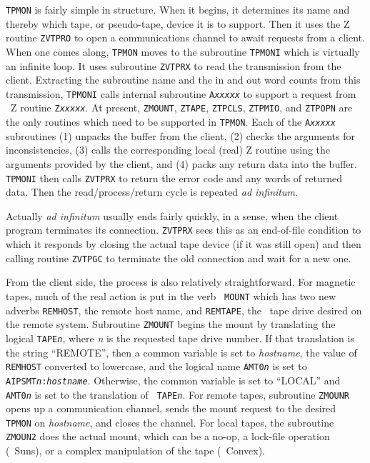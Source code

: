 {\tt TPMON} is fairly simple in structure.  When it begins, it
determines its name and thereby which tape, or pseudo-tape, device it
is to support.  Then it uses the Z routine {\tt ZVTPRO} to open a
communications channel to await requests from a client.  When one
comes along, {\tt TPMON} moves to the subroutine {\tt TPMONI} which is
virtually an infinite loop.  It uses subroutine {\tt ZVTPRX} to read
the transmission from the client.  Extracting the subroutine name and
the in and out word counts from this transmission, {\tt TPMONI} calls
internal subroutine {\tt A{\it xxxxx}} to support a request from
\AIPS\ Z routine {\tt Z{\it xxxxx}}.  At present, {\tt ZMOUNT},
{\tt ZTAPE}, {\tt ZTPCLS}, {\tt ZTPMIO}, and {\tt ZTPOPN} are the only
routines which need to be supported in {\tt TPMON}.  Each of the
 {\tt A{\it xxxxx}} subroutines (1) unpacks the buffer from the
client, (2) checks the arguments for inconsistencies, (3) calls the
corresponding local (real) Z routine using the arguments provided by
the client, and (4) packs any return data into the buffer.  {\tt
TPMONI} then calls {\tt ZVTPRX} to return the error code and any words
of returned data.  Then the read/process/return cycle is repeated {\it
ad infinitum}.

Actually {\it ad infinitum} usually ends fairly quickly, in a sense,
when the client program terminates its connection.  {\tt ZVTPRX} sees
this as an end-of-file condition to which it responds by closing the
actual tape device (if it was still open) and then calling routine
{\tt ZVTPGC} to terminate the old connection and wait for a new one.

From the client side, the process is also relatively straightforward.
For magnetic tapes, much of the real action is put in the verb {\tt
MOUNT} which has two new adverbs {\tt REMHOST}, the remote host name,
and {\tt REMTAPE}, the \AIPS\ tape drive desired on the remote system.
Subroutine {\tt ZMOUNT} begins the mount by translating the logical
{\tt TAPE{\it n}}, where {\it n} is the requested tape drive number.
If that translation is the string ``REMOTE'', then a common variable
is set to {\it hostname}, the value of {\tt REMHOST} converted to
lowercase, and the logical name {\tt AMT0{\it n}} is set to {\tt
AIPSMT{\it n}:{\it hostname}}.  Otherwise, the common variable is set
to ``LOCAL'' and {\tt AMT0{\it n}} is set to the translation of {\tt
TAPE{\it n}}.  For remote tapes, subroutine {\tt ZMOUNR} opens up a
communication channel, sends the mount request to the desired {\tt
TPMON} on {\it hostname}, and closes the channel.  For local tapes,
the subroutine {\tt ZMOUN2} does the actual mount, which can be a
no-op, a lock-file operation (\eg\ Suns), or a complex manipulation of
the tape (\eg\ Convex).

